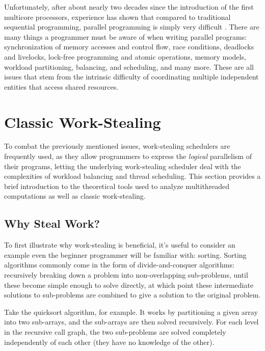 \documentclass[bsc,frontabs,singlespacing,parskip,deptreport,normalheadings]{infthesis}
\begin{document}
Unfortunately, after about nearly two decades since the introduction of the
first multicore processors, experience has shown that compared to traditional
sequential programming, parallel programming is simply very difficult
\cite{creeger_multicore_2005, lee_problem_2006, patterson_trouble_2010}. There
are many things a programmer must be aware of when writing parallel programs:
synchronization of memory accesses and control flow, race conditions,
deadlocks and livelocks, lock-free programming and atomic operations, memory
models, workload partitioning, balancing, and scheduling, and many more. These
are all issues that stem from the intrinsic difficulty of coordinating multiple
independent entities that access shared resources.

\section{Classic Work-Stealing}
\label{section:classic_work-stealing}

To combat the previously mentioned issues, work-stealing schedulers are
frequently used, as they allow programmers to express the \textit{logical}
parallelism of their programs, letting the underlying work-stealing scheduler
deal with the complexities of workload balancing and thread scheduling. This
section provides a brief introduction to the theoretical tools used to analyze
multithreaded computations as well as classic work-stealing.

\subsection{Why Steal Work?}

To first illustrate why work-stealing is beneficial, it's useful to consider an
example even the beginner programmer will be familiar with: sorting. Sorting
algorithms commonly come in the form of divide-and-conquer algorithms:
recursively breaking down a problem into non-overlapping sub-problems, until
these become simple enough to solve directly, at which point these intermediate
solutions to sub-problems are combined to give a solution to the original
problem.

Take the quicksort algorithm, for example. It works by partitioning a given
array into two sub-arrays, and the sub-arrays are then solved recursively. For
each level in the recursive call graph, the two sub-problems are solved
completely independently of each other (they have no knowledge of the other).
\end{document}
